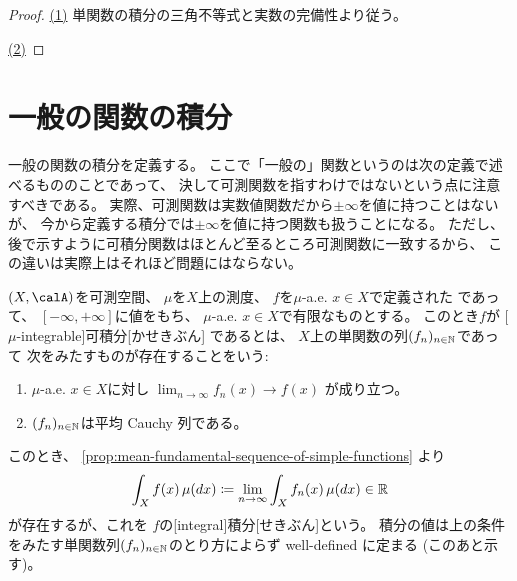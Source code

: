 \documentclass[report]{jlreq}
\begin{document}

\begin{proof}
    \uline{(1)} \quad
    単関数の積分の三角不等式と実数の完備性より従う。

    \uline{(2)} \quad
    \TODO{}
\end{proof}

%
\section{一般の関数の積分}

一般の関数の積分を定義する。
ここで「一般の」関数というのは次の定義で述べるもののことであって、
決して可測関数を指すわけではないという点に注意すべきである。
実際、可測関数は実数値関数だから$\pm\infty$を値に持つことはないが、
今から定義する積分では$\pm\infty$を値に持つ関数も扱うことになる。
ただし、後で示すように可積分関数はほとんど至るところ可測関数に一致するから、
この違いは実際上はそれほど問題にはならない。

\begin{definition}[一般の関数の積分]
    $(X, \calA)$を可測空間、
    $\mu$を$X$上の測度、
    $f$を$\mu$-a.e. $x \in X$で定義された
    であって、
    $[-\infty, +\infty]$に値をもち、
    $\mu$-a.e. $x \in X$で有限なものとする。
    このとき$f$が
    [$\mu$-integrable]{可積分}[かせきぶん]
    であるとは、
    $X$上の単関数の列$(f_n)_{n \in \mathbb{N}}$であって
    次をみたすものが存在することをいう:
    \begin{enumerate}
        \item $\mu$-a.e. $x \in X$に対し
            $\lim_{n \to \infty} f_n(x) \to f(x)$
            が成り立つ。
        \item $(f_n)_{n \in \mathbb{N}}$は平均 Cauchy 列である。
    \end{enumerate}
    このとき、
    \cref{prop:mean-fundamental-sequence-of-simple-functions}
    より
    \begin{equation}
        \int_X f(x) \, \mu(dx)
            \coloneqq \lim_{n \to \infty} \int_X f_n(x) \, \mu(dx)
            \in \mathbb{R}
    \end{equation}
    が存在するが、これを
    $f$の[integral]{積分}[せきぶん]という。
    積分の値は上の条件をみたす単関数列$(f_n)_{n \in \mathbb{N}}$のとり方によらず
    well-defined に定まる (このあと示す)。
\end{definition}
\end{document}
